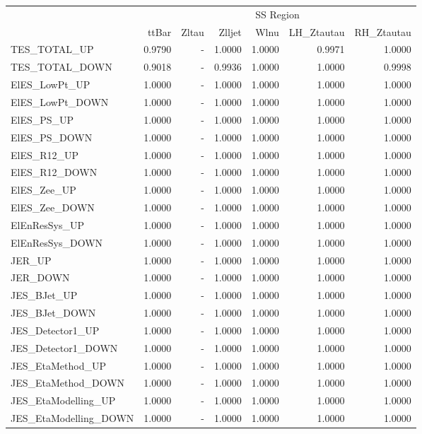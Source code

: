 \documentclass[11pt,oneside,a4paper]{article}
\begin{document}
\begin{table}
\centering
\begin{tabular}{lrrrrrr}
 & \multicolumn{6}{c}{SS Region} \\
 & ttBar & Zltau & Zlljet & Wlnu & LH\_Ztautau & RH\_Ztautau \\
TES\_TOTAL\_UP & 0.9790 & - & 1.0000 & 1.0000 & 0.9971 & 1.0000 \\
TES\_TOTAL\_DOWN & 0.9018 & - & 0.9936 & 1.0000 & 1.0000 & 0.9998 \\
ElES\_LowPt\_UP & 1.0000 & - & 1.0000 & 1.0000 & 1.0000 & 1.0000 \\
ElES\_LowPt\_DOWN & 1.0000 & - & 1.0000 & 1.0000 & 1.0000 & 1.0000 \\
ElES\_PS\_UP & 1.0000 & - & 1.0000 & 1.0000 & 1.0000 & 1.0000 \\
ElES\_PS\_DOWN & 1.0000 & - & 1.0000 & 1.0000 & 1.0000 & 1.0000 \\
ElES\_R12\_UP & 1.0000 & - & 1.0000 & 1.0000 & 1.0000 & 1.0000 \\
ElES\_R12\_DOWN & 1.0000 & - & 1.0000 & 1.0000 & 1.0000 & 1.0000 \\
ElES\_Zee\_UP & 1.0000 & - & 1.0000 & 1.0000 & 1.0000 & 1.0000 \\
ElES\_Zee\_DOWN & 1.0000 & - & 1.0000 & 1.0000 & 1.0000 & 1.0000 \\
ElEnResSys\_UP & 1.0000 & - & 1.0000 & 1.0000 & 1.0000 & 1.0000 \\
ElEnResSys\_DOWN & 1.0000 & - & 1.0000 & 1.0000 & 1.0000 & 1.0000 \\
JER\_UP & 1.0000 & - & 1.0000 & 1.0000 & 1.0000 & 1.0000 \\
JER\_DOWN & 1.0000 & - & 1.0000 & 1.0000 & 1.0000 & 1.0000 \\
JES\_BJet\_UP & 1.0000 & - & 1.0000 & 1.0000 & 1.0000 & 1.0000 \\
JES\_BJet\_DOWN & 1.0000 & - & 1.0000 & 1.0000 & 1.0000 & 1.0000 \\
JES\_Detector1\_UP & 1.0000 & - & 1.0000 & 1.0000 & 1.0000 & 1.0000 \\
JES\_Detector1\_DOWN & 1.0000 & - & 1.0000 & 1.0000 & 1.0000 & 1.0000 \\
JES\_EtaMethod\_UP & 1.0000 & - & 1.0000 & 1.0000 & 1.0000 & 1.0000 \\
JES\_EtaMethod\_DOWN & 1.0000 & - & 1.0000 & 1.0000 & 1.0000 & 1.0000 \\
JES\_EtaModelling\_UP & 1.0000 & - & 1.0000 & 1.0000 & 1.0000 & 1.0000 \\
JES\_EtaModelling\_DOWN & 1.0000 & - & 1.0000 & 1.0000 & 1.0000 & 1.0000 \\

\end{tabular}
\end{table}
\end{document}
